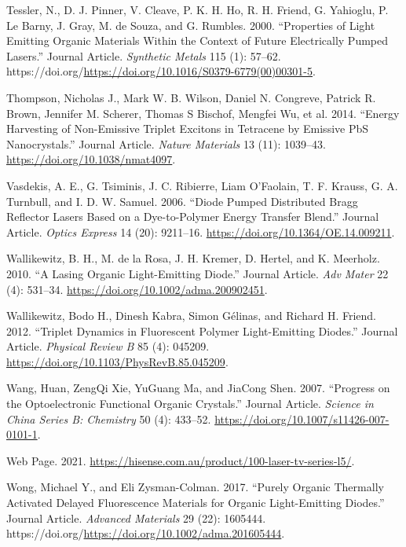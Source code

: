 \documentclass[
  letterpaper,
  DIV=11,
  numbers=noendperiod,
  oneside]{scrreprt}
\newlength{\cslhangindent}
\newlength{\cslentryspacingunit} %
\newenvironment{CSLReferences}[2] %
 {%
  \setlength{\parindent}{0pt}
  \ifodd #1
  \let\oldpar\par
  \def\par{\hangindent=\cslhangindent\oldpar}
  \fi
  \setlength{\parskip}{#2\cslentryspacingunit}
 }%
 {}
\begin{document}
\begin{CSLReferences}{1}{0}
\leavevmode{}%
Tessler, N., D. J. Pinner, V. Cleave, P. K. H. Ho, R. H. Friend, G.
Yahioglu, P. Le Barny, J. Gray, M. de Souza, and G. Rumbles. 2000.
{``Properties of Light Emitting Organic Materials Within the Context of
Future Electrically Pumped Lasers.''} Journal Article. \emph{Synthetic
Metals} 115 (1): 57--62.
https://doi.org/\url{https://doi.org/10.1016/S0379-6779(00)00301-5}.

\leavevmode{}%
Thompson, Nicholas J., Mark W. B. Wilson, Daniel N. Congreve, Patrick R.
Brown, Jennifer M. Scherer, Thomas S Bischof, Mengfei Wu, et al. 2014.
{``Energy Harvesting of Non-Emissive Triplet Excitons in Tetracene by
Emissive PbS Nanocrystals.''} Journal Article. \emph{Nature Materials}
13 (11): 1039--43. \url{https://doi.org/10.1038/nmat4097}.

\leavevmode{}%
Vasdekis, A. E., G. Tsiminis, J. C. Ribierre, Liam O'Faolain, T. F.
Krauss, G. A. Turnbull, and I. D. W. Samuel. 2006. {``Diode Pumped
Distributed Bragg Reflector Lasers Based on a Dye-to-Polymer Energy
Transfer Blend.''} Journal Article. \emph{Optics Express} 14 (20):
9211--16. \url{https://doi.org/10.1364/OE.14.009211}.

\leavevmode{}%
Wallikewitz, B. H., M. de la Rosa, J. H. Kremer, D. Hertel, and K.
Meerholz. 2010. {``A Lasing Organic Light-Emitting Diode.''} Journal
Article. \emph{Adv Mater} 22 (4): 531--34.
\url{https://doi.org/10.1002/adma.200902451}.

\leavevmode{}%
Wallikewitz, Bodo H., Dinesh Kabra, Simon Gélinas, and Richard H.
Friend. 2012. {``Triplet Dynamics in Fluorescent Polymer Light-Emitting
Diodes.''} Journal Article. \emph{Physical Review B} 85 (4): 045209.
\url{https://doi.org/10.1103/PhysRevB.85.045209}.

\leavevmode{}%
Wang, Huan, ZengQi Xie, YuGuang Ma, and JiaCong Shen. 2007. {``Progress
on the Optoelectronic Functional Organic Crystals.''} Journal Article.
\emph{Science in China Series B: Chemistry} 50 (4): 433--52.
\url{https://doi.org/10.1007/s11426-007-0101-1}.

\leavevmode{}%
Web Page. 2021.
\url{https://hisense.com.au/product/100-laser-tv-series-l5/}.

\leavevmode{}%
Wong, Michael Y., and Eli Zysman-Colman. 2017. {``Purely Organic
Thermally Activated Delayed Fluorescence Materials for Organic
Light-Emitting Diodes.''} Journal Article. \emph{Advanced Materials} 29
(22): 1605444.
https://doi.org/\url{https://doi.org/10.1002/adma.201605444}.


\end{CSLReferences}
\end{document}

